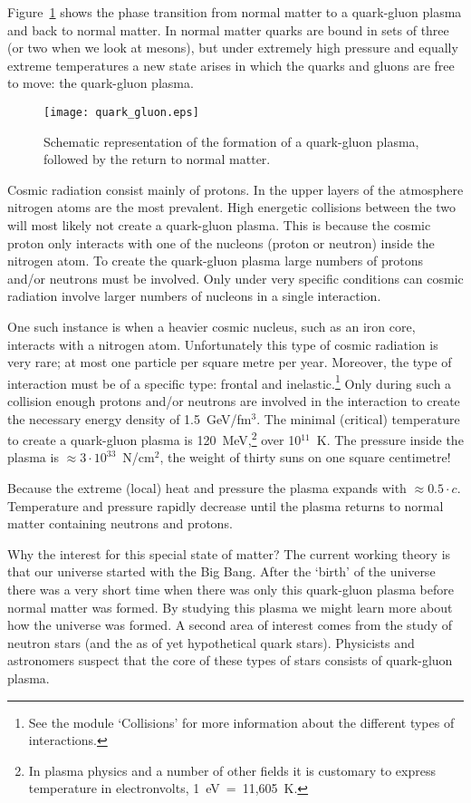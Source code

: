 Figure~\ref{fig:quark_gluon} shows the phase transition from normal matter to a quark-gluon plasma and back to normal matter. In normal matter quarks are bound in sets of three (or two when we look at mesons), but under extremely high pressure and equally extreme temperatures a new state arises in which the quarks and gluons are free to move: the quark-gluon plasma.

\begin{figure}\begin{center}
\texttt{[image: quark\_gluon.eps]}%
\caption{Schematic representation of the formation of a quark-gluon plasma, followed by the return to normal matter.}\label{fig:quark_gluon}
\end{center}\end{figure}

Cosmic radiation consist mainly of protons. In the upper layers of the atmosphere nitrogen atoms are the most prevalent. High energetic collisions between the two will most likely not create a quark-gluon plasma. This is because the cosmic proton only interacts with one of the nucleons (proton or neutron) inside the nitrogen atom. To create the quark-gluon plasma large numbers of protons and/or neutrons must be involved. Only under very specific conditions can cosmic radiation involve larger numbers of nucleons in a single interaction.

One such instance is when a heavier cosmic nucleus, such as an iron core, interacts with a nitrogen atom. Unfortunately this type of cosmic radiation is very rare; at most one particle per square metre per year. Moreover, the type of interaction must be of a specific type: frontal and inelastic.\footnote{See the module `Collisions' for more information about the different types of interactions.} Only during such a collision enough protons and/or neutrons are involved in the interaction to create the necessary energy density of 1.5~GeV/fm$^3$. The minimal (critical) temperature to create a quark-gluon plasma is 120~MeV,\footnote{In plasma physics and a number of other fields it is customary to express temperature in electronvolts, 1~eV~=~11,605~K.} over 10$^{11}$~K. The pressure inside the plasma is $\approx 3 \cdot 10^33$~N/cm$^2$, the weight of thirty suns on one square centimetre!

Because the extreme (local) heat and pressure the plasma expands with $\approx 0.5 \cdot c$. Temperature and pressure rapidly decrease until the plasma returns to normal matter containing neutrons and protons.

Why the interest for this special state of matter? The current working theory is that our universe started with the Big Bang. After the `birth' of the universe there was a very short time when there was only this quark-gluon plasma before normal matter was formed. By studying this plasma we might learn more about how the universe was formed. A second area of interest comes from the study of neutron  stars (and the as of yet hypothetical quark stars). Physicists and astronomers suspect that the core of these types of stars consists of quark-gluon plasma.
 

